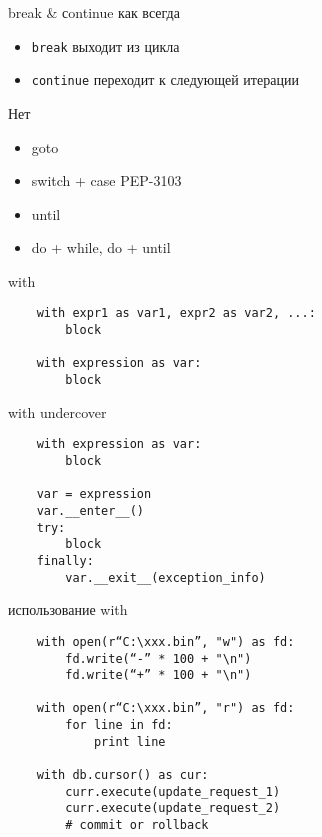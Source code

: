 \documentclass{article}
\begin{document}
\begin{center} break \& сontinue как всегда \end{center}
\begin{itemize}
	\item \lstinline!break!  выходит из цикла
	\item \lstinline!continue! переходит к следующей итерации
\end{itemize}
\newpage

\begin{center} Нет \end{center}
\begin{itemize}
	\item goto 
	\item switch + case PEP-3103
	\item until 
	\item do + while, do + until
\end{itemize}
\newpage

\begin{center} with \end{center}
\vspace{15pt}
\begin{lstlisting}
	with expr1 as var1, expr2 as var2, ...:
		block

	with expression as var:
		block

\end{lstlisting}
\newpage

\begin{center} with undercover \end{center}
\vspace{15pt}
\begin{lstlisting}
	with expression as var:
		block

	var = expression
	var.__enter__()
	try:
		block
	finally:
		var.__exit__(exception_info)
\end{lstlisting}
\newpage

\begin{center} использование with \end{center}
\vspace{15pt}
\begin{lstlisting}
	with open(r“C:\xxx.bin”, "w") as fd:
	    fd.write(“-” * 100 + "\n")
	    fd.write(“+” * 100 + "\n")

	with open(r“C:\xxx.bin”, "r") as fd:
	    for line in fd:
	    	print line

	with db.cursor() as cur:
	    curr.execute(update_request_1)
	    curr.execute(update_request_2)
		# commit or rollback
\end{lstlisting}
\newpage
\end{document}
